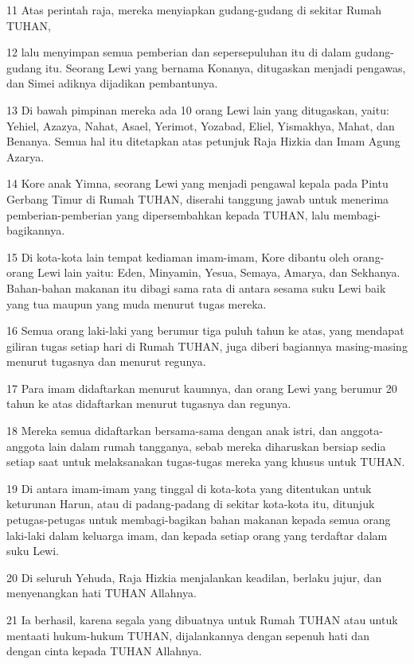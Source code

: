 \par 11 Atas perintah raja, mereka menyiapkan gudang-gudang di sekitar Rumah TUHAN,
\par 12 lalu menyimpan semua pemberian dan sepersepuluhan itu di dalam gudang-gudang itu. Seorang Lewi yang bernama Konanya, ditugaskan menjadi pengawas, dan Simei adiknya dijadikan pembantunya.
\par 13 Di bawah pimpinan mereka ada 10 orang Lewi lain yang ditugaskan, yaitu: Yehiel, Azazya, Nahat, Asael, Yerimot, Yozabad, Eliel, Yismakhya, Mahat, dan Benanya. Semua hal itu ditetapkan atas petunjuk Raja Hizkia dan Imam Agung Azarya.
\par 14 Kore anak Yimna, seorang Lewi yang menjadi pengawal kepala pada Pintu Gerbang Timur di Rumah TUHAN, diserahi tanggung jawab untuk menerima pemberian-pemberian yang dipersembahkan kepada TUHAN, lalu membagi-bagikannya.
\par 15 Di kota-kota lain tempat kediaman imam-imam, Kore dibantu oleh orang-orang Lewi lain yaitu: Eden, Minyamin, Yesua, Semaya, Amarya, dan Sekhanya. Bahan-bahan makanan itu dibagi sama rata di antara sesama suku Lewi baik yang tua maupun yang muda menurut tugas mereka.
\par 16 Semua orang laki-laki yang berumur tiga puluh tahun ke atas, yang mendapat giliran tugas setiap hari di Rumah TUHAN, juga diberi bagiannya masing-masing menurut tugasnya dan menurut regunya.
\par 17 Para imam didaftarkan menurut kaumnya, dan orang Lewi yang berumur 20 tahun ke atas didaftarkan menurut tugasnya dan regunya.
\par 18 Mereka semua didaftarkan bersama-sama dengan anak istri, dan anggota-anggota lain dalam rumah tangganya, sebab mereka diharuskan bersiap sedia setiap saat untuk melaksanakan tugas-tugas mereka yang khusus untuk TUHAN.
\par 19 Di antara imam-imam yang tinggal di kota-kota yang ditentukan untuk keturunan Harun, atau di padang-padang di sekitar kota-kota itu, ditunjuk petugas-petugas untuk membagi-bagikan bahan makanan kepada semua orang laki-laki dalam keluarga imam, dan kepada setiap orang yang terdaftar dalam suku Lewi.
\par 20 Di seluruh Yehuda, Raja Hizkia menjalankan keadilan, berlaku jujur, dan menyenangkan hati TUHAN Allahnya.
\par 21 Ia berhasil, karena segala yang dibuatnya untuk Rumah TUHAN atau untuk mentaati hukum-hukum TUHAN, dijalankannya dengan sepenuh hati dan dengan cinta kepada TUHAN Allahnya.

